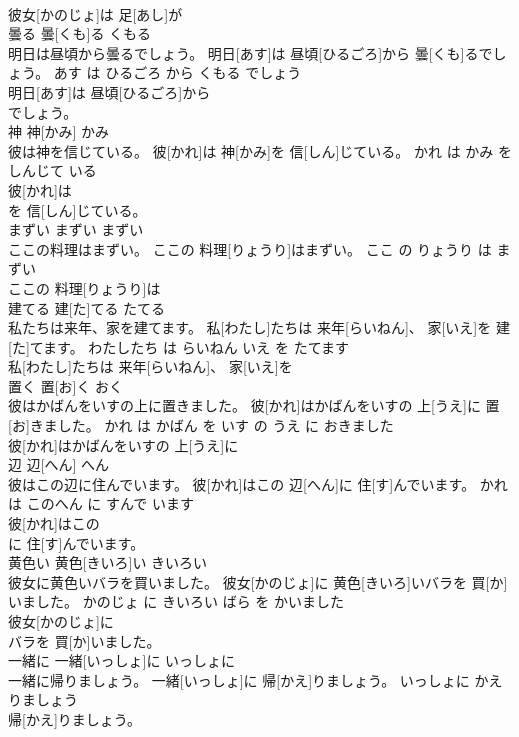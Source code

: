 \documentclass[8pt]{extreport}
\begin{document}
\begin{CJK}{UTF8}{min}
\\	彼女[かのじょ]は 足[あし]が
\\	曇る	曇[くも]る	くもる	
\\	明日は昼頃から曇るでしょう。	明日[あす]は 昼頃[ひるごろ]から 曇[くも]るでしょう。	あす は ひるごろ から くもる でしょう	
\\	明日[あす]は 昼頃[ひるごろ]から
\\	でしょう。			
\\	神	神[かみ]	かみ	
\\	彼は神を信じている。	彼[かれ]は 神[かみ]を 信[しん]じている。	かれ は かみ を しんじて いる	
\\	彼[かれ]は
\\	を 信[しん]じている。			
\\	まずい	まずい	まずい	
\\	ここの料理はまずい。	ここの 料理[りょうり]はまずい。	ここ の りょうり は まずい	
\\	ここの 料理[りょうり]は
\\	建てる	建[た]てる	たてる	
\\	私たちは来年、家を建てます。	私[わたし]たちは 来年[らいねん]、 家[いえ]を 建[た]てます。	わたしたち は らいねん いえ を たてます	
\\	私[わたし]たちは 来年[らいねん]、 家[いえ]を
\\	置く	置[お]く	おく	
\\	彼はかばんをいすの上に置きました。	彼[かれ]はかばんをいすの 上[うえ]に 置[お]きました。	かれ は かばん を いす の うえ に おきました	
\\	彼[かれ]はかばんをいすの 上[うえ]に
\\	辺	辺[へん]	へん	
\\	彼はこの辺に住んでいます。	彼[かれ]はこの 辺[へん]に 住[す]んでいます。	かれ は このへん に すんで います	
\\	彼[かれ]はこの
\\	に 住[す]んでいます。			
\\	黄色い	黄色[きいろ]い	きいろい	
\\	彼女に黄色いバラを買いました。	彼女[かのじょ]に 黄色[きいろ]いバラを 買[か]いました。	かのじょ に きいろい ばら を かいました	
\\	彼女[かのじょ]に
\\	バラを 買[か]いました。			
\\	一緒に	一緒[いっしょ]に	いっしょに	
\\	一緒に帰りましょう。	一緒[いっしょ]に 帰[かえ]りましょう。	いっしょに かえりましょう	
\\	帰[かえ]りましょう。			

\end{CJK}
\end{document}
